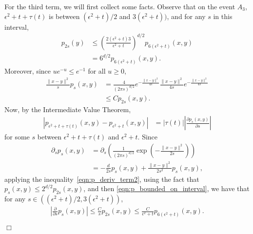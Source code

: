 \documentclass[12pt]{article}
\newenvironment {proof}{{\noindent\bf Proof }}{\hfill $\Box$ \medskip}
\numberwithin{equation}{section}
\begin{document}
\begin{proof}
    For the third term, we will first collect some facts.
    Observe that on the event $A_3$,
    $\epsilon^2 + t + \tau(t)$ is between
    $(\epsilon^2 + t)/ 2$ and $3(\epsilon^2 + t))$,
    and for any $s$ in this interval,
    \begin{align}
        p_{2s}(y)
        &\le \nonumber
        \left( \frac{
            2 (\epsilon^2 + t)3
        }{
            \epsilon^2 + t
        } \right)^{d/2}
        p_{6(\epsilon^2 + t)}(x, y)
        \\ &= \label{eqn:p_bounded_on_interval}
        6^{d/2}
        p_{6(\epsilon^2 + t)}(x, y) .
    \end{align}
    Moreover, since $u e^{-u} \le e^{-1}$ for all $u \ge 0$,
    \begin{align}
        \frac{\|x - y\|^2}{s} p_s(x, y)
        &= \nonumber
        \frac{4}{(2 \pi s)^{d/2}}
        e^{- \frac{ \|x-y\|^2 }{ 4s }}
        \frac{\|x-y\|^2}{4s}
        e^{- \frac{ \|x-y\|^2 }{ 4s }}
        \\ &\le \label{eqn:p_deriv_term2}
        C p_{2s}(x, y) .
    \end{align}
    Now, by the Intermediate Value Theorem,
    \begin{align}
\label{deduction from IVT}
        \left|
            p_{\epsilon^2 + t + \tau(t)}(x, y)
            -
            p_{\epsilon^2 + t}(x, y)
        \right|
        &=
        \left| \tau(t) \right|
        \left| \frac{\partial p_s(x, y)}{\partial s} \right|
    \end{align}
    for some $s$ between $\epsilon^2 + t + \tau(t)$ and $\epsilon^2 + t$.
   Since 
    \begin{align*}
        \partial_ s p_s(x, y)
        &=
        \partial_s
        \left(
            \frac{1}{(2 \pi s)^{d/2}}
            \exp\left( - \frac{\|x - y\|^2}{2 s} \right)
        \right)
        \\ &=
        - \frac{d}{2s} p_s(x, y) + \frac{\|x - y\|^2}{2 s^2} p_s(x, y),
    \end{align*}
    applying the inequality~\eqref{eqn:p_deriv_term2},
    using the fact that $p_s(x, y) \le 2^{d/2} p_{2s}(x,y)$,
    and then \eqref{eqn:p_bounded_on_interval},
    we have that for any $s \in ((\epsilon^2 + t)/ 2, 3(\epsilon^2 + t))$,
    \begin{align*}
        \left| \frac{\partial}{\partial s} p_s(x, y) \right|
        \le
        \frac{C}{s} p_{2s}(x, y) 
        \le
        \frac{C}{\epsilon^2 + t} p_{6(\epsilon^2 + t)}(x, y) .
    \end{align*}

\end{proof}
\end{document}
